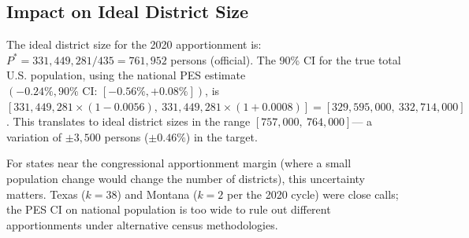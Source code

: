 \subsection{Impact on Ideal District Size}

The ideal district size for the 2020 apportionment is:
$P^* = 331,449,281 / 435 = 761,952$ persons (official).
The 90\% CI for the true total U.S. population, using the national
PES estimate $(-0.24\%, 90\%\text{ CI: }[-0.56\%, +0.08\%])$, is
$[331,449,281 \times (1 - 0.0056),\ 331,449,281 \times (1 + 0.0008)]
= [329,595,000,\ 332,714,000]$.
This translates to ideal district sizes in the range $[757,000,\ 764,000]$---
a variation of $\pm 3,500$ persons ($\pm 0.46\%$) in the target.

For states near the congressional apportionment margin (where a small
population change would change the number of districts), this uncertainty
matters. Texas ($k=38$) and Montana ($k=2$ per the 2020 cycle) were
close calls; the PES CI on national population is too wide to rule out
different apportionments under alternative census methodologies.
